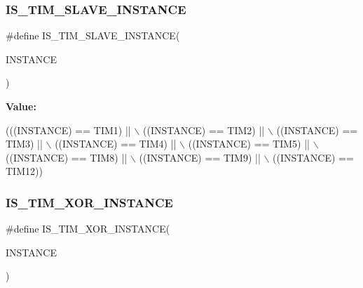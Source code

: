 \subsubsection{\texorpdfstring{I\+S\+\_\+\+T\+I\+M\+\_\+\+S\+L\+A\+V\+E\+\_\+\+I\+N\+S\+T\+A\+N\+CE}{IS\_TIM\_SLAVE\_INSTANCE}}
{\footnotesize\ttfamily \#define I\+S\+\_\+\+T\+I\+M\+\_\+\+S\+L\+A\+V\+E\+\_\+\+I\+N\+S\+T\+A\+N\+CE(\begin{DoxyParamCaption}\item[{}]{I\+N\+S\+T\+A\+N\+CE }\end{DoxyParamCaption})}

{\bfseries Value\+:}
\begin{DoxyCode}
(((INSTANCE) == TIM1) || \(\backslash\)
                                         ((INSTANCE) == TIM2) || \(\backslash\)
                                         ((INSTANCE) == TIM3) || \(\backslash\)
                                         ((INSTANCE) == TIM4) || \(\backslash\)
                                         ((INSTANCE) == TIM5) || \(\backslash\)
                                         ((INSTANCE) == TIM8) || \(\backslash\)
                                         ((INSTANCE) == TIM9) || \(\backslash\)
                                         ((INSTANCE) == TIM12))
\end{DoxyCode}
\mbox{\label{group___exported__macros_ga6e06388143bb7bb111c78a3686dd753a}} 
\subsubsection{\texorpdfstring{I\+S\+\_\+\+T\+I\+M\+\_\+\+X\+O\+R\+\_\+\+I\+N\+S\+T\+A\+N\+CE}{IS\_TIM\_XOR\_INSTANCE}}
{\footnotesize\ttfamily \#define I\+S\+\_\+\+T\+I\+M\+\_\+\+X\+O\+R\+\_\+\+I\+N\+S\+T\+A\+N\+CE(\begin{DoxyParamCaption}\item[{}]{I\+N\+S\+T\+A\+N\+CE }\end{DoxyParamCaption})}

